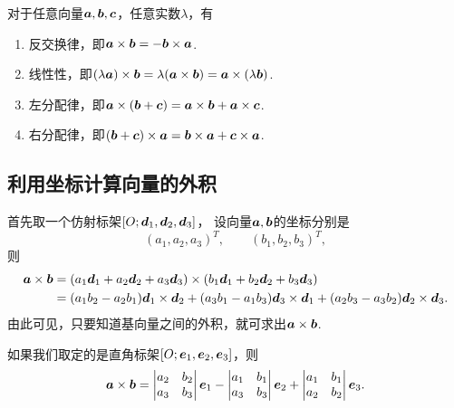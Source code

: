 \begin{theorem}
对于任意向量\(\boldsymbol{a},\boldsymbol{b},\boldsymbol{c}\)，任意实数\(\lambda\)，有
\begin{enumerate}
	\item 反交换律，即\(\boldsymbol{a}\times\boldsymbol{b}=-\boldsymbol{b}\times\boldsymbol{a}\).
	\item 线性性，即\((\lambda \boldsymbol{a})\times\boldsymbol{b}
	= \lambda(\boldsymbol{a}\times\boldsymbol{b})
	= \boldsymbol{a}\times(\lambda \boldsymbol{b})\).
	\item 左分配律，即\(\boldsymbol{a}\times(\boldsymbol{b}+\boldsymbol{c})
	= \boldsymbol{a}\times\boldsymbol{b} + \boldsymbol{a}\times\boldsymbol{c}\).
	\item 右分配律，即\((\boldsymbol{b}+\boldsymbol{c})\times\boldsymbol{a}
	= \boldsymbol{b}\times\boldsymbol{a} + \boldsymbol{c}\times\boldsymbol{a}\).
\end{enumerate}
\end{theorem}

\subsection{利用坐标计算向量的外积}
首先取一个仿射标架\([O;\boldsymbol{d}_1,\boldsymbol{d}_2,\boldsymbol{d}_3]\)，
设向量\(\boldsymbol{a},\boldsymbol{b}\)的坐标分别是\[
	(a_1,a_2,a_3)^T, \qquad
	(b_1,b_2,b_3)^T,
\]
则\begin{equation}
\begin{split}
	\boldsymbol{a}\times\boldsymbol{b}
	&= (a_1 \boldsymbol{d}_1 + a_2 \boldsymbol{d}_2 + a_3 \boldsymbol{d}_3)
	\times (b_1 \boldsymbol{d}_1 + b_2 \boldsymbol{d}_2 + b_3 \boldsymbol{d}_3) \\
	&= (a_1 b_2 - a_2 b_1) \boldsymbol{d}_1 \times \boldsymbol{d}_2
	+ (a_3 b_1 - a_1 b_3) \boldsymbol{d}_3 \times \boldsymbol{d}_1
	+ (a_2 b_3 - a_3 b_2) \boldsymbol{d}_2 \times \boldsymbol{d}_3.
\end{split}
\end{equation}
由此可见，只要知道基向量之间的外积，就可求出\(\boldsymbol{a}\times\boldsymbol{b}\).

如果我们取定的是直角标架\([O;\boldsymbol{e}_1,\boldsymbol{e}_2,\boldsymbol{e}_3]\)，则
\begin{equation}
	\boldsymbol{a}\times\boldsymbol{b}
	= \begin{vmatrix}
		a_2 & b_2 \\
		a_3 & b_3
	\end{vmatrix}
	\boldsymbol{e}_1
	- \begin{vmatrix}
		a_1 & b_1 \\
		a_3 & b_3
	\end{vmatrix}
	\boldsymbol{e}_2
	+ \begin{vmatrix}
		a_1 & b_1 \\
		a_2 & b_2
	\end{vmatrix}
	\boldsymbol{e}_3.
\end{equation}


